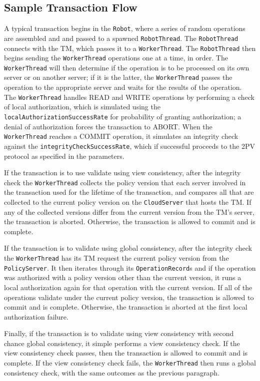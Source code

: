 \documentclass[11pt]{article}
\begin{document}
\subsection{Sample Transaction Flow}
A typical transaction begins in the \texttt{Robot}, where a series of random operations are assembled and and passed to a spawned \texttt{RobotThread}. The \texttt{RobotThread} connects with the TM, which passes it to a \texttt{WorkerThread}. The \texttt{RobotThread} then begins sending the \texttt{WorkerThread} operations one at a time, in order. The \texttt{WorkerThread} will then determine if the operation is to be processed on its own server or on another server; if it is the latter, the \texttt{WorkerThread} passes the operation to the appropriate server and waits for the results of the operation. The \texttt{WorkerThread} handles READ and WRITE operations by performing a check of local authorization, which is simulated using the \texttt{localAuthorizationSuccessRate} for probability of granting authorization; a denial of authorization forces the transaction to ABORT. When the \texttt{WorkerThread} reaches a COMMIT operation, it simulates an integrity check against the \texttt{integrityCheckSuccessRate}, which if successful proceeds to the 2PV protocol as specified in the parameters.

If the transaction is to use validate using view consistency, after the integrity check the \texttt{WorkerThread} collects the policy version that each server involved in the transaction used for the lifetime of the transaction, and compares all that are collected to the current policy version on the \texttt{CloudServer} that hosts the TM. If any of the collected versions differ from the current version from the TM's server, the transaction is aborted. Otherwise, the transaction is allowed to commit and is complete.

If the transaction is to validate using global consistency, after the integrity check the \texttt{WorkerThread} has its TM request the current policy version from the \texttt{PolicyServer}. It then iterates through its \texttt{OperationRecord}s and if the operation was authorized with a policy version other than the current version, it runs a local authorization again for that operation with the current version. If all of the operations validate under the current policy version, the transaction is allowed to commit and is complete. Otherwise, the transaction is aborted at the first local authorization failure.

Finally, if the transaction is to validate using view consistency with second chance global consistency, it simple performs a view consistency check. If the view consistency check passes, then the transaction is allowed to commit and is complete. If the view consistency check fails, the \texttt{WorkerThread} then runs a global consistency check, with the same outcomes as the previous paragraph.
\end{document}
